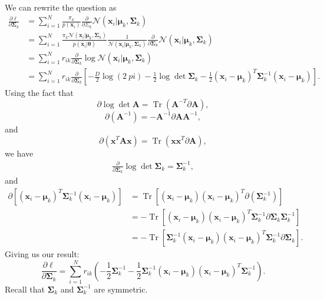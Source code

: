 \documentclass[a4paper,11pt]{article}
\DeclareMathOperator{\Tr}{Tr}
\begin{document}
We can rewrite the question as
\begin{align*}
    \frac{ \partial \ell }{ \partial \boldsymbol{\Sigma}_k }
    &= \sum\limits_{i=1}^{N}
    \frac{ \pi_k }{ p( \mathbf{x}_i )} \frac\partial{ \partial \Sigma_k }
    \mathcal{N}( \mathbf{x}_i | \boldsymbol{\mu}_k, \boldsymbol{\Sigma}_k ) \\
    &= \sum\limits_{i=1}^{N} \frac{
        \pi_k \mathcal{N}( \mathbf{x}_i | \boldsymbol{\mu}_k, \boldsymbol{\Sigma}_k )
    }{
        p( \mathbf{x}_i | \mathbf{\theta} )
    }
    \frac1{ \mathcal{N}( \mathbf{x}_i | \boldsymbol{\mu}_k, \boldsymbol{\Sigma}_k) }
    \frac\partial{ \partial \boldsymbol{\Sigma}_k }
    \mathcal{N}( \mathbf{x}_i | \boldsymbol{\mu}_k, \boldsymbol{\Sigma}_k ) \\
    &= \sum\limits_{i=1}^{N} r_{ik} \frac\partial{ \partial \boldsymbol{\Sigma}_k }
    \log \mathcal{N}( \mathbf{x}_i | \boldsymbol{\mu}_k, \boldsymbol{\Sigma}_k ) \\
    &= \sum\limits_{i=1}^{N}
	r_{ik} \frac\partial{ \partial \boldsymbol{\Sigma}_k } \left[
        - \frac{ D }2 \log( 2 \ pi )
		- \frac12 \log \det \boldsymbol{\Sigma}_k
        - \frac12 ( \mathbf{x}_i - \boldsymbol{\mu}_k ) ^ T
        \boldsymbol{\Sigma}^{-1}_k ( \mathbf{x}_i - \boldsymbol{\mu}_k )
    \right].
\end{align*}
Using the fact that
\[
    \partial \log \det \mathbf{A} = \Tr( \mathbf{A}^{-T} \partial \mathbf{A} ),
\]
\[
    \partial( \mathbf{A}^{-1} ) = -\mathbf{A}^{-1} \partial\mathbf{A} \mathbf{A}^{-1},
\]
and
\[
    \partial( \mathbf{x}^T \mathbf{A} \mathbf{x} )
	= \Tr( \mathbf{x} \mathbf{x}^T \partial\mathbf{A} ),
\]
we have
\begin{align*} 
    \frac\partial{ \partial\boldsymbol{\Sigma}_k }
    \log \det \boldsymbol\Sigma_k =
    \boldsymbol{\Sigma}_k^{-1},
\end{align*}
and
\begin{align*}
    \partial\left[
		( \mathbf{x}_i - \boldsymbol{\mu}_k )^T
        \boldsymbol{\Sigma}^{-1}_k
		(\mathbf{x}_i - \boldsymbol{\mu}_k)
	\right] &= \Tr\left[
		( \mathbf{x}_i - \boldsymbol{\mu}_k )( \mathbf{x}_i - \boldsymbol{\mu}_k )^T
		\partial( \boldsymbol{\Sigma}^{-1}_k )
	\right] \\
    &= -\Tr\left[
        ( \mathbf{x}_i - \boldsymbol{\mu}_k )( \mathbf{x}_i - \boldsymbol{\mu}_k )^T
        \boldsymbol{\Sigma}^{-1}_k
        \partial\boldsymbol{\Sigma}_k
        \boldsymbol{\Sigma}^{-1}_k
    \right] \\
    & =  -\Tr\left[
        \boldsymbol{\Sigma}^{-1}_k
        ( \mathbf{x}_i - \boldsymbol{\mu}_k )( \mathbf{x}_i - \boldsymbol{\mu}_k )^T
        \boldsymbol{\Sigma}^{-1}_k
        \partial\boldsymbol{\Sigma}_k
    \right].
\end{align*}
Giving us our result:
\[
    \frac{ \partial\ell }{ \partial\boldsymbol{\Sigma}_k } =
    \sum\limits_{i=1}^{N}
    r_{ik} \left(
        -\frac12 \boldsymbol\Sigma_k^{-1}
        -\frac12 \boldsymbol{\Sigma}^{-1}_k
		( \mathbf{x}_i - \boldsymbol{\mu}_k )( \mathbf{x}_i - \boldsymbol{\mu}_k )^T
		\boldsymbol{\Sigma}^{-1}_k
    \right).
\]
Recall that $\boldsymbol\Sigma_k$ and $\boldsymbol\Sigma_k^{-1}$ are symmetric.
\end{document}
